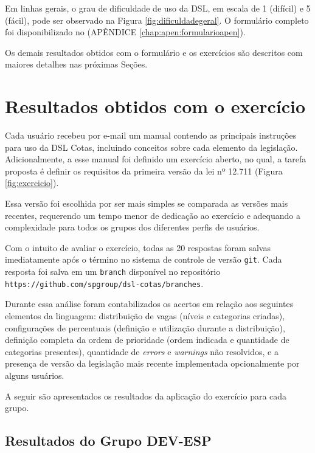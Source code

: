 Em linhas gerais, o grau de dificuldade de uso da DSL, em escala de 1 (difícil) e 5 (fácil), pode ser observado na Figura \ref{fig:dificuldadegeral}. O formulário completo foi disponibilizado no (APÊNDICE \ref{chap:apen:formularioapen}). 



\newpage
Os demais resultados obtidos com o formulário e os exercícios são descritos com maiores detalhes nas próximas Seções.




\section{Resultados obtidos com o exercício}
\label{sec:analiseexercicio}

Cada usuário recebeu por e-mail um manual  contendo as principais instruções para uso da DSL Cotas, incluindo conceitos sobre cada elemento da legislação. Adicionalmente, a esse manual foi definido um exercício aberto, no qual, a tarefa proposta é definir os requisitos da primeira versão da lei nº 12.711 (Figura \ref{fig:exercicio}). 



Essa versão foi escolhida por ser mais simples se comparada as versões mais recentes, requerendo um tempo menor de dedicação ao exercício e adequando a complexidade para todos os grupos dos diferentes perfis de usuários. 


Com o intuito de avaliar o exercício, todas as 20 respostas foram salvas imediatamente após o término no sistema de controle de versão \texttt{git}. Cada resposta foi salva em um \texttt{branch} disponível no repositório \texttt{https://github.com/spgroup/dsl-cotas/branches}.


Durante essa análise foram contabilizados os acertos em relação aos seguintes elementos da linguagem: distribuição de vagas (níveis e categorias criadas), configurações de percentuais (definição e utilização durante a distribuição), definição completa da ordem de prioridade (ordem indicada e quantidade de categorias presentes), quantidade de \textit{errors} e \textit{warnings} não resolvidos, e a presença de versão da legislação mais recente implementada opcionalmente por alguns usuários.

A seguir são apresentados os resultados da aplicação do exercício para cada grupo.

\newpage
\subsection{Resultados do Grupo DEV-ESP}
\label{subsec:devesp}

